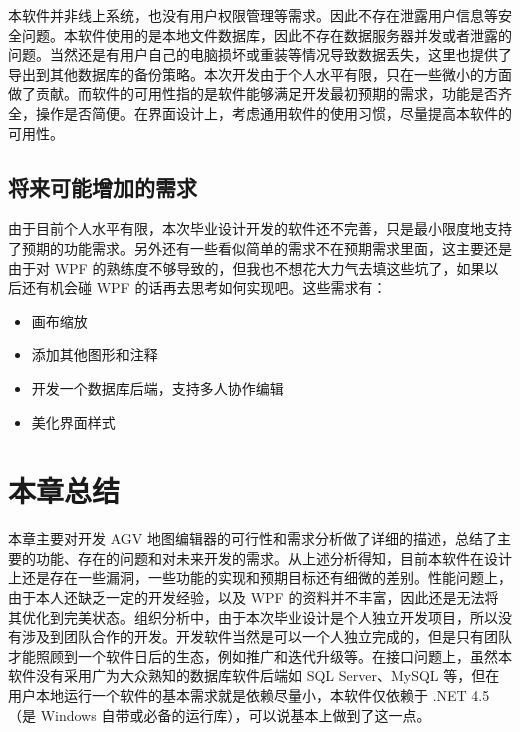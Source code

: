 本软件并非线上系统，也没有用户权限管理等需求。因此不存在泄露用户信息等安全问题。本软件使用的是本地文件数据库，因此不存在数据服务器并发或者泄露的问题。当然还是有用户自己的电脑损坏或重装等情况导致数据丢失，这里也提供了导出到其他数据库的备份策略。本次开发由于个人水平有限，只在一些微小的方面做了贡献。而软件的可用性指的是软件能够满足开发最初预期的需求，功能是否齐全，操作是否简便。在界面设计上，考虑通用软件的使用习惯，尽量提高本软件的可用性。

\subsection{将来可能增加的需求}

由于目前个人水平有限，本次毕业设计开发的软件还不完善，只是最小限度地支持了预期的功能需求。另外还有一些看似简单的需求不在预期需求里面，这主要还是由于对 WPF 的熟练度不够导致的，但我也不想花大力气去填这些坑了，如果以后还有机会碰 WPF 的话再去思考如何实现吧。这些需求有：

\begin{itemize}
  \item 画布缩放
  \item 添加其他图形和注释
  \item 开发一个数据库后端，支持多人协作编辑
  \item 美化界面样式
\end{itemize}

\section{本章总结}

本章主要对开发 AGV 地图编辑器的可行性和需求分析做了详细的描述，总结了主要的功能、存在的问题和对未来开发的需求。从上述分析得知，目前本软件在设计上还是存在一些漏洞，一些功能的实现和预期目标还有细微的差别。性能问题上，由于本人还缺乏一定的开发经验，以及 WPF 的资料并不丰富，因此还是无法将其优化到完美状态。组织分析中，由于本次毕业设计是个人独立开发项目，所以没有涉及到团队合作的开发。开发软件当然是可以一个人独立完成的，但是只有团队才能照顾到一个软件日后的生态，例如推广和迭代升级等。在接口问题上，虽然本软件没有采用广为大众熟知的数据库软件后端如 SQL Server、MySQL 等，但在用户本地运行一个软件的基本需求就是依赖尽量小，本软件仅依赖于 .NET 4.5（是 Windows 自带或必备的运行库），可以说基本上做到了这一点。
